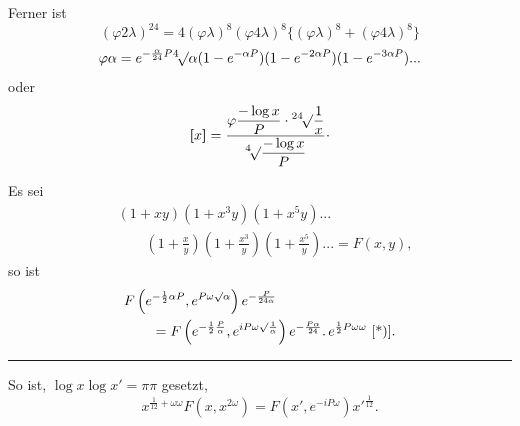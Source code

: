 \clearpage
{}
\noindent Ferner ist
\[
(\varphi2\lambda)^{24}=4(\varphi\lambda)^8(\varphi4\lambda)^8\{(\varphi\lambda)^8+(\varphi4\lambda)^8\}
\]
\[
\varphi\alpha=e^{-\frac\alpha{24}P}{}^{4}\!\surd\alpha(1-e^{-\alpha P})(1-e^{-2\alpha P})(1-e^{-3\alpha P}){.}{.}{.}
\]
\noindent oder
\[
\TransBracket{x}=\frac{\displaystyle\varphi\frac{-\log x}{P}\cdot\IndexSurd{24}\frac1x}{\displaystyle\IndexSurd{4}\frac{-\log x}{P}}\mathpunct{\raisebox{.5ex}{.}}
\]
\ClosingRule
\par\indent Es sei
\[\begin{aligned}
&(1+xy)(1+x^3y)(1+x^5y){.}{.}{.}\\
&\qquad\left(1+\frac xy\right)\left(1+\frac{x^3}y\right)\left(1+\frac{x^5}y\right){.}{.}{.}=F(x,y),
\end{aligned}\]
\noindent so ist
\[\begin{aligned}
&F\left(e^{-\frac12\alpha P},e^{P\omega\surd\alpha}\right)e^{-\frac{P}{24\alpha}}\\
&\qquad=F\left(e^{-\frac12\frac P\alpha},e^{iP\omega\surd\frac1\alpha}\right)e^{-\frac{P\alpha}{24}}.\,e^{\frac12P\omega\omega}\ \text{[*)]}.
\end{aligned}\]
\par\smallskip\noindent\rule{.25\linewidth}{.4pt}\par
{\small\par\indent [*)] So ist, $\log x\log x'=\pi\pi$ gesetzt,
\[
x^{\frac1{12}+\omega\omega}F(x,x^{2\omega})=F(x',e^{-iP\omega})x'^{\frac1{12}}.
\]
\par}
\clearpage
\endgroup
